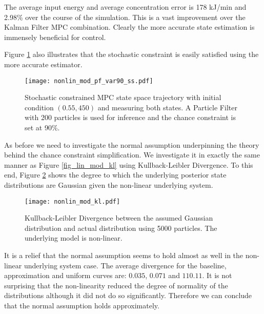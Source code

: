 The average input energy and average concentration error is 178 kJ/min and 2.98\% over the course of the simulation. This is a vast improvement over the Kalman Filter MPC combination. Clearly the more accurate state estimation is immensely beneficial for control.

Figure \ref{fig_nonlin_mod_pf_var90_ss} also illustrates that the stochastic constraint is easily satisfied using the more accurate estimator.
\begin{figure}[H] 
\centering
\texttt{[image: nonlin\_mod\_pf\_var90\_ss.pdf]}
\caption{Stochastic constrained MPC state space trajectory with initial condition $(0.55, 450)$ and measuring both states. A Particle Filter with 200 particles is used for inference and the chance constraint is set at 90\%.}
\label{fig_nonlin_mod_pf_var90_ss}
\end{figure}
As before we need to investigate the normal assumption underpinning the theory behind the chance constraint simplification. We investigate it in exactly the same manner as Figure \ref{fig_lin_mod_kl} using Kullback-Leibler Divergence. To this end, Figure \ref{fig_nonlin_mod_kl} shows the degree to which the underlying posterior state distributions are Gaussian given the non-linear underlying system.
\begin{figure}[H] 
\centering
\texttt{[image: nonlin\_mod\_kl.pdf]}
\caption{Kullback-Leibler Divergence between the assumed Gaussian distribution and actual distribution using 5000 particles. The underlying model is non-linear.}
\label{fig_nonlin_mod_kl}
\end{figure}
It is a relief that the normal assumption seems to hold almost as well in the non-linear underlying system case. The average divergence for the baseline, approximation and uniform curves are: $0.035$, $0.071$ and $110.11$. It is not surprising that the non-linearity reduced the degree of normality of the distributions although it did not do so significantly. Therefore we can conclude that the normal assumption holds approximately.

